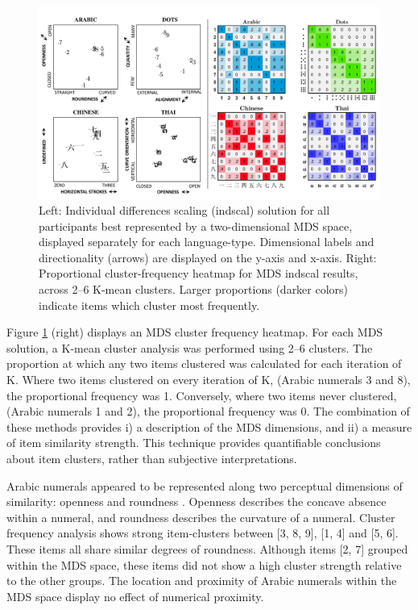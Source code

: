 \begin{figure}[tbh]
\centering \includegraphics[width = \linewidth]{Figures/CrossWheel/Indscal2D.pdf}
\caption{Left: Individual differences scaling (indscal) solution for all participants best represented by a two-dimensional MDS space, displayed separately for each language-type. Dimensional labels and directionality (arrows) are displayed on the y-axis and x-axis. Right: Proportional cluster-frequency heatmap for MDS indscal results, across 2--6 K-mean clusters. Larger proportions (darker colors) indicate items which cluster most frequently.}
\label{fig:Indscal_Cross}
\end{figure}

Figure \ref{fig:Indscal_Cross} (right) displays an MDS cluster frequency heatmap. For each MDS solution, a K-mean cluster analysis was performed using 2--6 clusters. The proportion at which any two items clustered was calculated for each iteration of K. Where two items clustered on every iteration of K, (\eg Arabic numerals 3 and 8), the proportional frequency was 1. Conversely, where two items never clustered, (\eg Arabic numerals 1 and 2), the proportional frequency was 0. The combination of these methods provides i) a description of the MDS dimensions, and ii) a measure of item similarity strength. This technique provides quantifiable conclusions about item clusters, rather than subjective interpretations. 

Arabic numerals appeared to be represented along two perceptual dimensions of similarity: openness and roundness \cite<similar results were observed by>{godwin2014numSim}. Openness describes the concave absence within a numeral, and roundness describes the curvature of a numeral. Cluster frequency analysis shows strong item-clusters between [3, 8, 9], [1, 4] and [5, 6]. These items all share similar degrees of roundness. Although items [2, 7] grouped within the MDS space, these items did not show a high cluster strength relative to the other groups. The location and proximity of Arabic numerals within the MDS space display no effect of numerical proximity. 


